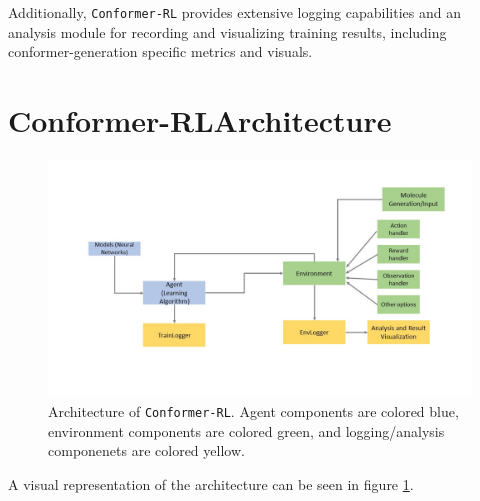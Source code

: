 \documentclass[twoside,11pt]{article}
\newcommand{\code}[1]{\texttt{#1}}
\newcommand{\titleofpaper}{Conformer-RL}
\begin{document}
Additionally, \code{\titleofpaper} provides extensive logging capabilities and an analysis module for recording and visualizing training results, including conformer-generation specific metrics and visuals.

\section{\titleofpaper \space Architecture}
\begin{figure}[h]
  \centering
  \includegraphics[width=\textwidth]{architectures.jpg}
  \caption{Architecture of \code{\titleofpaper}. Agent components are colored blue, environment components are colored green, and logging/analysis componenets are colored yellow.}
  \label{fig:architecture}
\end{figure}
  A visual representation of the architecture can be seen in figure \ref{fig:architecture}.
\end{document}
